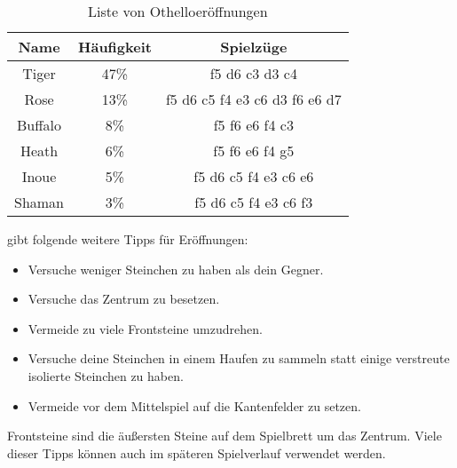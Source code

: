 \begin{table}[h]
  \centering
  \begin{tabular}{| c | c | c |}
    \hline
     Name & Häufigkeit & Spielzüge \\ \hline
     Tiger  &   47\%   & f5 d6 c3 d3 c4 \\ \hline
     Rose &   13\%   & f5 d6 c5 f4 e3 c6 d3 f6 e6 d7 \\ \hline
     Buffalo &  8\%    & f5 f6 e6 f4 c3 \\ \hline
     Heath  &  6\%    &  f5 f6 e6 f4 g5 \\ \hline
     Inoue &   5\%   &  f5 d6 c5 f4 e3 c6 e6\\ \hline
     Shaman &   3\%   & f5 d6 c5 f4 e3 c6 f3 \\ \hline
  \end{tabular}
  \caption{Liste von Othelloeröffnungen \cite{Ortiz.}}
  \label{tab:eroeffnungen}
\end{table}
\cite{Ortiz.} gibt folgende weitere Tipps für Eröffnungen:
\begin{itemize}
\item Versuche weniger Steinchen zu haben als dein Gegner.
\item Versuche das Zentrum zu besetzen.
\item Vermeide zu viele Frontsteine umzudrehen.
\item Versuche deine Steinchen in einem Haufen zu sammeln statt einige verstreute isolierte Steinchen zu haben.
\item Vermeide vor dem Mittelspiel auf die Kantenfelder zu setzen.
\end{itemize}
Frontsteine sind die äußersten Steine auf dem Spielbrett um das Zentrum.
Viele dieser Tipps können auch im späteren Spielverlauf verwendet werden.